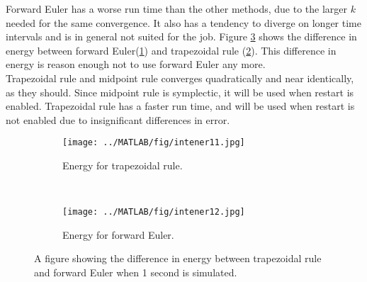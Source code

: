 \noindent Forward Euler has a worse run time than the other methods, due to the larger $k$ needed for the same convergence. It also has a tendency to diverge on longer time intervals and is in general not suited for the job. Figure \ref{fig:forwardenergy} shows the difference in energy between forward Euler(\ref{fig:fe1}) and trapezoidal rule (\ref{fig:fe2}). This difference in energy is reason enough not to use forward Euler any more.\\

\noindent Trapezoidal rule and midpoint rule converges quadratically and near identically, as they should. Since midpoint rule is symplectic, it will be used when restart is enabled. Trapezoidal rule has a faster run time, and will be used when restart is not enabled due to insignificant differences in error.%

\begin{figure}[H]
        \centering
        \begin{subfigure}[b]{0.45\textwidth}
                \texttt{[image: ../MATLAB/fig/intener11.jpg]}
                \caption{ Energy for trapezoidal rule. }
                \label{fig:fe1}
        \end{subfigure}
        ~
        \begin{subfigure}[b]{0.45\textwidth}
                \texttt{[image: ../MATLAB/fig/intener12.jpg]}
                \caption{ Energy for forward Euler. }  
				\label{fig:fe2}
        \end{subfigure}                
\caption{ A figure showing the difference in energy between trapezoidal rule and forward Euler when 1 second is simulated. }
\label{fig:forwardenergy}
\end{figure}

